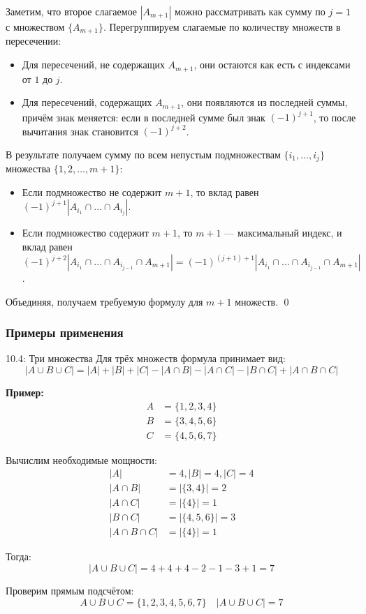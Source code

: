 \documentclass[a4paper,12pt]{article}
\begin{document}
	Заметим, что второе слагаемое $|A_{m+1}|$ можно рассматривать как сумму по $j=1$ с множеством $\{A_{m+1}\}$. Перегруппируем слагаемые по количеству множеств в пересечении:
	
	\begin{itemize}
		\item Для пересечений, не содержащих $A_{m+1}$, они остаются как есть с индексами от $1$ до $j$.
		\item Для пересечений, содержащих $A_{m+1}$, они появляются из последней суммы, причём знак меняется: если в последней сумме был знак $(-1)^{j+1}$, то после вычитания знак становится $(-1)^{j+2}$.
	\end{itemize}
	
	В результате получаем сумму по всем непустым подмножествам $\{i_1, \dots, i_j\}$ множества $\{1, 2, \dots, m+1\}$:
	\begin{itemize}
		\item Если подмножество не содержит $m+1$, то вклад равен $(-1)^{j+1} |A_{i_1} \cap \dots \cap A_{i_j}|$.
		\item Если подмножество содержит $m+1$, то $m+1$ — максимальный индекс, и вклад равен $(-1)^{j+2} |A_{i_1} \cap \dots \cap A_{i_{j-1}} \cap A_{m+1}| = (-1)^{(j+1)+1} |A_{i_1} \cap \dots \cap A_{i_{j-1}} \cap A_{m+1}|$.
	\end{itemize}
	
	Объединяя, получаем требуемую формулу для $m+1$ множеств. \qed
	
	\subsubsection{Примеры применения}
	
	\begin{examplebox}{10.4: Три множества}
		Для трёх множеств формула принимает вид:
		\[ |A \cup B \cup C| = |A| + |B| + |C| - |A \cap B| - |A \cap C| - |B \cap C| + |A \cap B \cap C| \]
		
		\textbf{Пример:} 
		\begin{align*}
			A &= \{1, 2, 3, 4\} \\
			B &= \{3, 4, 5, 6\} \\
			C &= \{4, 5, 6, 7\}
		\end{align*}
		
		Вычислим необходимые мощности:
		\begin{align*}
			|A| &= 4, |B| = 4, |C| = 4 \\
			|A \cap B| &= |\{3,4\}| = 2 \\
			|A \cap C| &= |\{4\}| = 1 \\
			|B \cap C| &= |\{4,5,6\}| = 3 \\
			|A \cap B \cap C| &= |\{4\}| = 1
		\end{align*}
		
		Тогда:
		\[ |A \cup B \cup C| = 4 + 4 + 4 - 2 - 1 - 3 + 1 = 7 \]
		
		Проверим прямым подсчётом:
		\[ A \cup B \cup C = \{1, 2, 3, 4, 5, 6, 7\} \quad |A \cup B \cup C| = 7 \]
	\end{examplebox}
	
\end{document}
